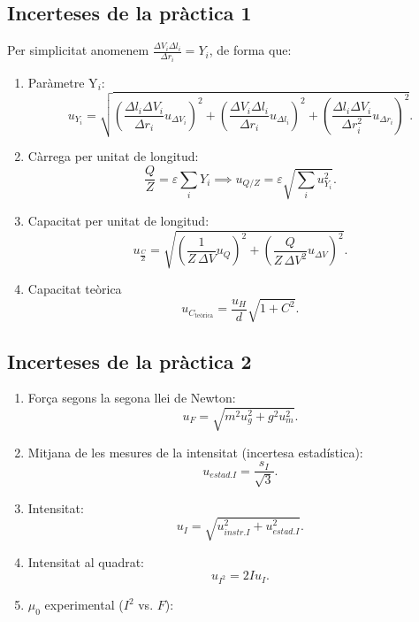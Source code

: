 \documentclass[a4paper,10.5pt]{report}
\begin{document}
\begin{appendices}
\subsection{Incerteses de la pràctica 1}
Per simplicitat anomenem $\frac{\Delta V_i \Delta l_i}{\Delta r_i} = Y_i$, de forma que:
\begin{enumerate}
	\item Paràmetre Y$_i$: \begin{equation}
		u_{Y_i} = \sqrt{ \left( \frac{\Delta l_i \Delta V_i}{\Delta r_i} u_{\Delta V_i} \right)^2 + \left( \frac{\Delta V_i \Delta l_i}{\Delta r_i} u_{\Delta l_i} \right)^2 + \left( \frac{\Delta l_i \Delta V_i}{\Delta r_i^2} u_{\Delta r_i} \right)^2 }.
	\end{equation}
	\item Càrrega per unitat de longitud:\begin{equation}
		\frac{Q}{Z} = \varepsilon \sum_i Y_i \implies u_{Q/Z} = \varepsilon \sqrt{\sum_i u_{Y_i}^2}.
	\end{equation}
	\item Capacitat per unitat de longitud:\begin{equation}
		u_{\frac{C}{Z}} = \sqrt{ \left( \frac{1}{Z \, \Delta V} u_Q \right)^2 + \left( \frac{Q}{Z \, \Delta V^2} u_{\Delta V} \right)^2 }.
	\end{equation}
	\item Capacitat teòrica\begin{equation}
		u_{C_\text{teòrica}} = \frac{u_H}{d} \sqrt{1+C^2}.
	\end{equation}
\end{enumerate}
\subsection{Incerteses de la pràctica 2}
\begin{enumerate}
	\item Força segons la segona llei de Newton: \begin{equation}
		u_F=\sqrt{m^2u_g^2+g^2u_m^2}.
	\end{equation}
	\item Mitjana de les mesures de la intensitat (incertesa estadística): \begin{equation}
		u_{estad. I}= \frac{s_I}{\sqrt{3}}.
	\end{equation}
	\item Intensitat: \begin{equation}
		u_I=\sqrt{u_{instr. I}^2+u_{estad. I}^2}.
	\end{equation}
	\item Intensitat al quadrat: \begin{equation}
		u_{I^2}=2Iu_I.
	\end{equation}
	\item $\mu_0$ experimental ($I^2$ vs. $F$):


\end{enumerate}
\end{appendices}
\end{document}

